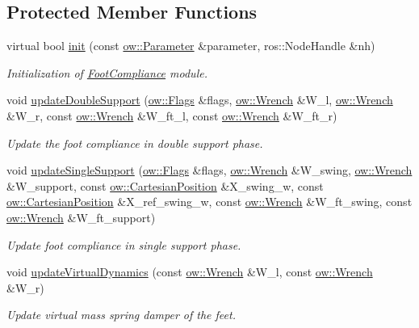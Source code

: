 \subsection*{Protected Member Functions}
\begin{DoxyCompactItemize}
\item 
virtual bool \hyperlink{classow__fcm_1_1FootCompliance_ad2459eb9b3936e928465a7a00dfb20c4}{init} (const \hyperlink{classow_1_1Parameter}{ow\+::\+Parameter} \&parameter, ros\+::\+Node\+Handle \&nh)\hypertarget{classow__fcm_1_1FootCompliance_ad2459eb9b3936e928465a7a00dfb20c4}{}\label{classow__fcm_1_1FootCompliance_ad2459eb9b3936e928465a7a00dfb20c4}

\begin{DoxyCompactList}\small\item\em Initialization of \hyperlink{classow__fcm_1_1FootCompliance}{Foot\+Compliance} module. \end{DoxyCompactList}\item 
void \hyperlink{classow__fcm_1_1FootCompliance_a3cc2db3f1db84c25b7a8ac0b9b8c6a0f}{update\+Double\+Support} (\hyperlink{classow__core_1_1Flags}{ow\+::\+Flags} \&flags, \hyperlink{classow__core_1_1Wrench}{ow\+::\+Wrench} \&W\+\_\+l, \hyperlink{classow__core_1_1Wrench}{ow\+::\+Wrench} \&W\+\_\+r, const \hyperlink{classow__core_1_1Wrench}{ow\+::\+Wrench} \&W\+\_\+ft\+\_\+l, const \hyperlink{classow__core_1_1Wrench}{ow\+::\+Wrench} \&W\+\_\+ft\+\_\+r)
\begin{DoxyCompactList}\small\item\em Update the foot compliance in double support phase. \end{DoxyCompactList}\item 
void \hyperlink{classow__fcm_1_1FootCompliance_a68491d3bc71c19a743f6fa050af09fd4}{update\+Single\+Support} (\hyperlink{classow__core_1_1Flags}{ow\+::\+Flags} \&flags, \hyperlink{classow__core_1_1Wrench}{ow\+::\+Wrench} \&W\+\_\+swing, \hyperlink{classow__core_1_1Wrench}{ow\+::\+Wrench} \&W\+\_\+support, const \hyperlink{classow__core_1_1CartesianPosition}{ow\+::\+Cartesian\+Position} \&X\+\_\+swing\+\_\+w, const \hyperlink{classow__core_1_1CartesianPosition}{ow\+::\+Cartesian\+Position} \&X\+\_\+ref\+\_\+swing\+\_\+w, const \hyperlink{classow__core_1_1Wrench}{ow\+::\+Wrench} \&W\+\_\+ft\+\_\+swing, const \hyperlink{classow__core_1_1Wrench}{ow\+::\+Wrench} \&W\+\_\+ft\+\_\+support)
\begin{DoxyCompactList}\small\item\em Update foot compliance in single support phase. \end{DoxyCompactList}\item 
void \hyperlink{classow__fcm_1_1FootCompliance_ab05d352491c98be91a253ba7c88fd2b7}{update\+Virtual\+Dynamics} (const \hyperlink{classow__core_1_1Wrench}{ow\+::\+Wrench} \&W\+\_\+l, const \hyperlink{classow__core_1_1Wrench}{ow\+::\+Wrench} \&W\+\_\+r)
\begin{DoxyCompactList}\small\item\em Update virtual mass spring damper of the feet. \end{DoxyCompactList}\end{DoxyCompactItemize}
